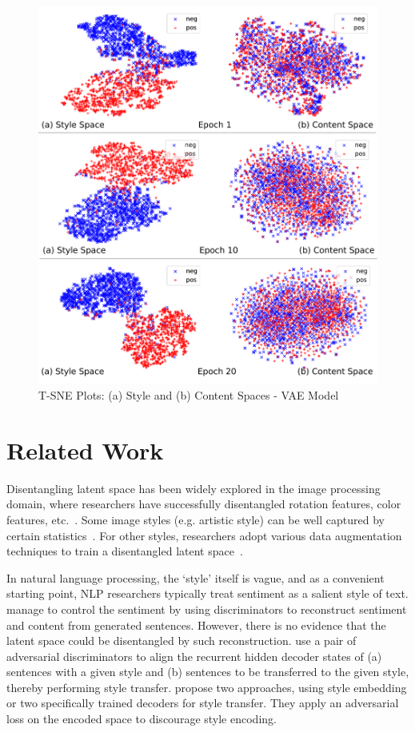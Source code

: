 \documentclass[11pt,a4paper]{article}
\begin{document}
\begin{figure}[ht]
	\captionsetup{justification=centering}
	\includegraphics[width=\linewidth]{latent-spaces-vae}
	\caption{T-SNE Plots: (a) Style and (b) Content Spaces - VAE Model}
	\label{fig:vae-tsne}
\end{figure}


\section{Related Work}

Disentangling latent space has been widely explored in the image processing domain, where researchers have successfully disentangled rotation features, color features, etc.~\cite{chen2016infogan,luan2017deep}. Some image styles (e.g. artistic style) can be well captured by certain statistics~\cite{gatys2016image}. For other styles, researchers adopt various data augmentation techniques to train a disentangled latent space~\cite{kulkarni2015deep,champandard2016semantic}.

In natural language processing, the `style' itself is vague, and as a convenient starting point, NLP researchers typically treat sentiment as a salient style of text. \citet{hu2017toward} manage to control the sentiment by using discriminators to reconstruct sentiment and content from generated sentences. However, there is no evidence that the latent space could be disentangled by such reconstruction. \citet{shen2017style} use a pair of adversarial discriminators to align the recurrent hidden decoder states of (a) sentences with a given style and (b) sentences to be transferred to the given style, thereby performing style transfer. \citet{fu2017style} propose two approaches, using style embedding or two specifically trained decoders for style transfer. They apply an adversarial loss on the encoded space to discourage style encoding.
\end{document}
